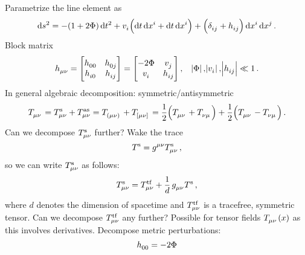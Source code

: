 Parametrize the line element as
\begin{equation}
	\dif s^2 = - \left(1+2\Phi\right)\dif t^2 + \tensor{v}{_i} \left(\dif t \dif \tensor{x}{^i} + \dif t \dif \tensor{x}{^i}\right) + \left(\tensor{\delta}{_{ij}} + \tensor{h}{_{ij}} \right)\dif \tensor{x}{^i}\dif \tensor{x}{^j}\,.
\end{equation}
Block matrix
\begin{equation}
	\tensor{h}{_{\mu\nu}} =
	\begin{bmatrix}
		\tensor{h}{_{00}} & \tensor{h}{_{0j}} \\
		\tensor{h}{_{i0}} & \tensor{h}{_{ij}}
	\end{bmatrix}
	=
	\begin{bmatrix}
		-2\Phi & \tensor{v}{_{j}} \\
		\tensor{v}{_{i}} & \tensor{h}{_{ij}}
	\end{bmatrix}
	\, , \quad \abs{\Phi},\abs{\tensor{v}{_i}},\abs{\tensor{h}{_{ij}}} \ll 1\,.
\end{equation}
In general algebraic decomposition: symmetric/antisymmetric
\begin{equation}
	\tensor{T}{_{\mu\nu}} = \tensor*{T}{_{\mu\nu}^{\text{s}}} + \tensor*{T}{_{\mu\nu}^{\text{as}}} = \tensor{T}{_{(\mu\nu)}} + \tensor{T}{_{[\mu\nu]}} = \frac{1}{2}\left(\tensor{T}{_{\mu\nu}}+\tensor{T}{_{\nu\mu}}\right) + \frac{1}{2}\left(\tensor{T}{_{\mu\nu}}-\tensor{T}{_{\nu\mu}}\right)\,.
\end{equation}
Can we decompose $\tensor*{T}{_{\mu\nu}^{\text{s}}}$ further?\newline
Wake the trace
\begin{equation}
	\tensor{T}{^{\text{s}}} = \tensor{g}{^{\mu\nu}}\tensor*{T}{_{\mu\nu}^{\text{s}}}\, ,
\end{equation}
so we can write $\tensor*{T}{_{\mu\nu}^{\text{s}}}$ as follows:
\begin{equation}
	\tensor*{T}{_{\mu\nu}^{\text{s}}} = \tensor*{T}{_{\mu\nu}^{\text{tf}}} + \frac{1}{d}\,\tensor{g}{_{\mu\nu}}\tensor{T}{^{\text{s}}}\,,
\end{equation}
where $d$ denotes the dimension of spacetime and $\tensor*{T}{_{\mu\nu}^{\text{tf}}}$ is a tracefree, symmetric tensor.
Can we decompose $\tensor*{T}{_{\mu\nu}^{\text{tf}}}$ any further? Possible for tensor fields $\tensor{T}{_{\mu\nu}}(x)$ as this involves derivatives.
Decompose metric perturbations:
\begin{equation}
	\tensor{h}{_{00}} = -2\Phi
\end{equation}
